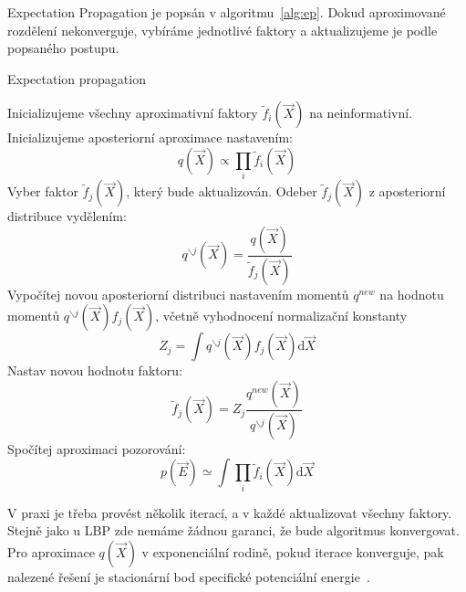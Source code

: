 Expectation Propagation je popsán v algoritmu~\ref{alg:ep}.
Dokud aproximované rozdělení nekonverguje, vybíráme jednotlivé faktory a aktualizujeme je podle popsaného postupu.

\begin{algorithm}
\caption{Expectation propagation}
\label{alg:ep}
\begin{algorithmic}
\State Inicializujeme všechny aproximativní faktory $\tilde{f}_i(\vec{X})$ na neinformativní.
\State Inicializujeme aposteriorní aproximace nastavením: $$q(\vec{X}) \propto \prod_i \tilde{f}_i(\vec{X})$$
\Repeat
    \State Vyber faktor $\tilde{f}_j(\vec{X})$, který bude aktualizován.
    \State Odeber $\tilde{f}_j(\vec{X})$ z aposteriorní distribuce vydělením: $$q^{\backslash j} (\vec{X}) = \frac{q(\vec{X})}{\tilde{f}_j(\vec{X})}$$
    \State Vypočítej novou aposteriorní distribuci nastavením momentů $q^{new}$ na 
    \State hodnotu momentů $q^{\backslash j}(\vec{X})f_j(\vec{X})$, včetně vyhodnocení normalizační 
    \State konstanty $$Z_j = \int q^{\backslash j}(\vec{X}) f_j(\vec{X}) \mathrm{d}\vec{X}$$
    \State Nastav novou hodnotu faktoru: $$\tilde{f}_j(\vec{X}) = Z_j \frac{q^{new}(\vec{X})}{q^{\backslash j}(\vec{X})}$$
\State Spočítej aproximaci pozorování: $$p(\vec{E}) \simeq \int \prod_i \tilde{f}_i(\vec{X}) \mathrm{d}\vec{X}$$
\end{algorithmic}
\end{algorithm}

V praxi je třeba provést několik iterací, a v každé aktualizovat všechny faktory.
Stejně jako u LBP zde nemáme žádnou garanci, že bude algoritmus konvergovat.
Pro aproximace $q(\vec{X})$ v exponenciální rodině, pokud iterace konverguje, pak nalezené řešení je stacionární bod specifické potenciální energie~\cite{minka2001expectation}.

